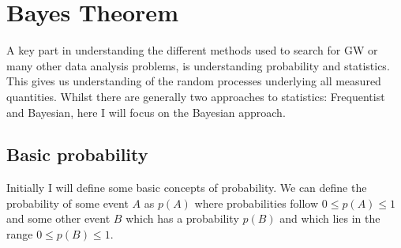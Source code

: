 \section{\label{intro:prob} Bayes Theorem}

A key part in understanding the different methods used to search for
\gls{GW} or many other data analysis problems, is understanding probability
and statistics.  This gives us understanding of the random processes
underlying all measured quantities.  Whilst there are generally two approaches
to statistics: Frequentist and Bayesian, here I will focus on the Bayesian
approach.  

\subsection{\label{intro:prob:basic}Basic probability}

Initially I will define some basic concepts of probability.  We can define the
probability of some event $A$ as $p(A)$ where probabilities follow $0 \leq p(A)
\leq 1$ and some other event $B$ which has a probability $p(B)$ and
which lies in the range $0 \leq p(B) \leq 1$.

